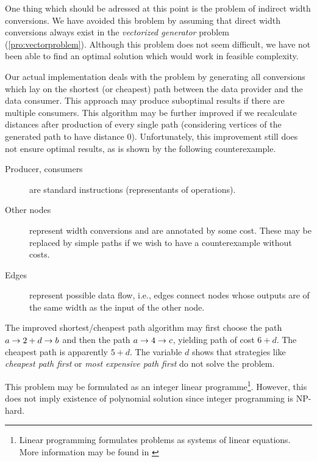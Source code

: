 
One thing which should be adressed at this point is the problem of indirect width conversions. We have avoided this broblem by assuming that direct width conversions always exist in the \emph{vectorized generator} problem (\ref{pro:vectorproblem}).  Although this problem does not seem difficult, we have not been able to find an optimal solution which would work in feasible complexity. 

Our actual implementation deals with the problem by generating all conversions which lay on the shortest (or cheapest) path between the data provider and the data consumer. This approach may produce suboptimal results if there are multiple consumers. This algorithm may be further improved if we recalculate distances after production of every single path (considering vertices of the generated path to have distance 0). Unfortunately, this improvement still does not ensure optimal results, as is shown by the following counterexample.


\begin{description}
  \item[Producer, consumers] are standard instructions (representants of operations).
  \item[Other nodes] represent width conversions and are annotated by some cost. These may be replaced by simple paths if we wish to have a counterexample without costs.
  \item[Edges] represent possible data flow, i.e., edges connect nodes whose outputs are of the same width as the input of the other node.
  \end{description}

The improved shortest/cheapest path algorithm may first choose the path $ a \rightarrow 2 + d \rightarrow b $ and then the path $ a \rightarrow 4 \rightarrow c $, yielding path of cost $6+d$. The cheapest path is apparently $5+d$. The variable $d$ shows that strategies like \emph{cheapest path first} or \emph{most expensive path first} do not solve the problem.

This problem may be formulated as an integer linear programme\footnote{Linear programming formulates problems as systems of linear equations. More information may be found in \cite{TODO}}. However, this does not imply existence of polynomial solution since integer programming is NP-hard. 

